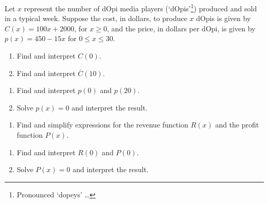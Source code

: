 \begin{ex} \label{costrevenueprofitex1}  Let $x$ represent the number of dOpi media players (`dOpis'\footnote{Pronounced `dopeys' \ldots}) produced and sold in a typical week.  Suppose the cost, in dollars, to produce $x$ dOpis  is given by   $C(x) = 100x + 2000$, for $x \geq 0$, and the price, in dollars per dOpi, is given by $p(x) = 450-15x$ for $0 \leq x \leq 30$.

\begin{multicols}{2}
\begin{enumerate}

\item  Find and interpret $C(0)$.
\item  Find and interpret $\overline{C}(10)$.

\setcounter{HW}{\value{enumi}}
\end{enumerate}
\end{multicols}
\vspace{-.2in}
\begin{multicols}{2}
\begin{enumerate}
\setcounter{enumi}{\value{HW}}

\item  Find and interpret $p(0)$ and $p(20)$.
\item  Solve $p(x) = 0$ and interpret the result.

\setcounter{HW}{\value{enumi}}
\end{enumerate}
\end{multicols}
\vspace{-.2in}
\begin{enumerate}
\setcounter{enumi}{\value{HW}}

\item  Find and simplify expressions for the revenue function $R(x)$ and the profit function $P(x)$.

\setcounter{HW}{\value{enumi}}
\end{enumerate}
\enlargethispage{.3in} \vspace{-.2in}
\begin{multicols}{2}
\begin{enumerate}
\setcounter{enumi}{\value{HW}}

\item  Find and interpret $R(0)$ and $P(0)$.
\item  Solve $P(x) = 0$ and interpret the result.

\end{enumerate}
\end{multicols}


\end{ex}
